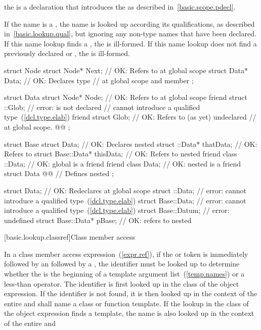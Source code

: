 the  is a declaration that
introduces the  as described
in~\ref{basic.scope.pdecl}.

\pnum
If the name is a , the name is looked up
according its qualifications, as described in~\ref{basic.lookup.qual},
but ignoring any non-type names that have been declared.
If this name lookup finds a ,
the  is ill-formed.
If this name lookup does not find a previously declared
 or , the
 is ill-formed. \enterexample

\begin{codeblock}
struct Node {
	struct Node* Next;      // OK: Refers to  at global scope
	struct Data* Data;      // OK: Declares type 
				// at global scope and member 
};

struct Data {
	struct Node* Node;      // OK: Refers to  at global scope
	friend struct ::Glob;   // error:  is not declared
                                // cannot introduce a qualified type~(\ref{dcl.type.elab})
	friend struct Glob;     // OK: Refers to (as yet) undeclared 
				// at global scope.
	@@
};

struct Base {
	struct Data;			// OK: Declares nested 
	struct ::Data*     thatData;	// OK: Refers to 
	struct Base::Data* thisData;	// OK: Refers to nested 
	friend class ::Data;		// OK: global  is a friend
	friend class Data;		// OK: nested  is a friend
	struct Data @@	 // Defines nested 
};

struct Data;			// OK: Redeclares  at global scope
struct ::Data;                  // error: cannot introduce a qualified type~(\ref{dcl.type.elab})
struct Base::Data;              // error: cannot introduce a qualified type~(\ref{dcl.type.elab})
struct Base::Datum;             // error:  undefined
struct Base::Data* pBase;       // OK: refers to nested 
\end{codeblock}
\exitexampleb %
%

[basic.lookup.classref]{Class member access}

\pnum
{}%
In a class member access expression~(\ref{expr.ref}), if the 
or \tcode{->} token is immediately followed by an 
followed by a \tcode{<}, the identifier must be looked up to determine
whether the \tcode{<} is the beginning of a template argument
list~(\ref{temp.names}) or a less-than operator. The identifier is first
looked up in the class of the object expression. If the identifier is
not found, it is then looked up in the context of the entire
 and shall name a class or function
template. If the lookup in the class of the object expression finds a
template, the name is also looked up in the context of the entire
 and


